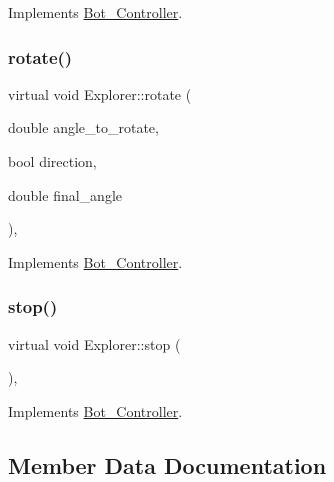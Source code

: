 Implements \hyperlink{class_bot___controller_ae357ee9ea3ec7a5000f39532fc52fa72}{Bot\+\_\+\+Controller}.

\mbox{\label{class_explorer_a2616a65bd251592f1b9f151546d429d8}} 
\subsubsection{\texorpdfstring{rotate()}{rotate()}}
{\footnotesize\ttfamily virtual void Explorer\+::rotate (\begin{DoxyParamCaption}\item[{double}]{angle\+\_\+to\+\_\+rotate,  }\item[{bool}]{direction,  }\item[{double}]{final\+\_\+angle }\end{DoxyParamCaption})\hspace{0.3cm}{\ttfamily [override]}, {\ttfamily [virtual]}}



Implements \hyperlink{class_bot___controller_a19ba7ced629e4ee9a0743efdef4a5cc7}{Bot\+\_\+\+Controller}.

\mbox{\label{class_explorer_a44a5755de0e7a3934265a8f9ab4c9b2e}} 
\subsubsection{\texorpdfstring{stop()}{stop()}}
{\footnotesize\ttfamily virtual void Explorer\+::stop (\begin{DoxyParamCaption}{ }\end{DoxyParamCaption})\hspace{0.3cm}{\ttfamily [override]}, {\ttfamily [virtual]}}



Implements \hyperlink{class_bot___controller_a28d1caa8c0ed9d8fb313caacecc5e71b}{Bot\+\_\+\+Controller}.



\subsection{Member Data Documentation}
\mbox{\label{class_explorer_acfbbc5075675a523b7995d6c2db06eff}} 
